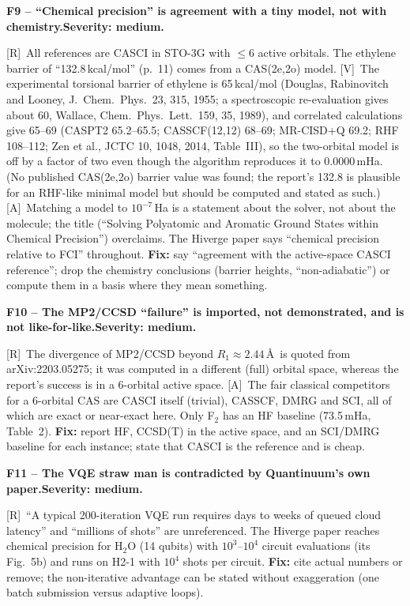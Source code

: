 \documentclass[11pt,a4paper]{article}
\newcommand{\lR}{\textcolor{keyblue}{[R]}}   %
\newcommand{\lV}{\textcolor{keyblue}{[V]}}   %
\newcommand{\lA}{\textcolor{notegray}{[A]}}  %
\newcommand{\sev}[1]{\textbf{Severity: #1.}}
\newcommand{\flaw}[4]{\par\medskip\noindent\textbf{#1 -- #2.}\quad{\small\textcolor{notegray}{Where: #3.}}\quad\sev{#4}\par\nobreak}
\begin{document}
\flaw{F9}{``Chemical precision'' is agreement with a tiny model, not with chemistry}{title; abstract; p.~10, Table~2; p.~11}{medium}
\lR\ All references are CASCI in STO-3G with $\le6$ active orbitals. The ethylene barrier of ``132.8\,kcal/mol'' (p.~11) comes from a CAS(2e,2o) model. \lV\ The experimental torsional barrier of ethylene is 65\,kcal/mol (Douglas, Rabinovitch and Looney, J.\ Chem.\ Phys.\ 23, 315, 1955; a spectroscopic re-evaluation gives about 60, Wallace, Chem.\ Phys.\ Lett.\ 159, 35, 1989), and correlated calculations give 65--69 (CASPT2 65.2--65.5; CASSCF(12,12) 68--69; MR-CISD+Q 69.2; RHF 108--112; Zen et al., JCTC 10, 1048, 2014, Table~III), so the two-orbital model is off by a factor of two even though the algorithm reproduces it to 0.0000\,mHa. (No published CAS(2e,2o) barrier value was found; the report's 132.8 is plausible for an RHF-like minimal model but should be computed and stated as such.) \lA\ Matching a model to $10^{-7}$\,Ha is a statement about the solver, not about the molecule; the title (``Solving Polyatomic and Aromatic Ground States within Chemical Precision'') overclaims. The Hiverge paper says ``chemical precision relative to FCI'' throughout. \textbf{Fix:} say ``agreement with the active-space CASCI reference''; drop the chemistry conclusions (barrier heights, ``non-adiabatic'') or compute them in a basis where they mean something.

\flaw{F10}{The MP2/CCSD ``failure'' is imported, not demonstrated, and is not like-for-like}{abstract; p.~11, Sec.~5.2}{medium}
\lR\ The divergence of MP2/CCSD beyond $R_1\approx2.44$\,\AA\ is quoted from arXiv:2203.05275; it was computed in a different (full) orbital space, whereas the report's success is in a 6-orbital active space. \lA\ The fair classical competitors for a 6-orbital CAS are CASCI itself (trivial), CASSCF, DMRG and SCI, all of which are exact or near-exact here. Only F$_2$ has an HF baseline (73.5\,mHa, Table~2). \textbf{Fix:} report HF, CCSD(T) in the active space, and an SCI/DMRG baseline for each instance; state that CASCI is the reference and is cheap.

\flaw{F11}{The VQE straw man is contradicted by Quantinuum's own paper}{p.~3, Sec.~1.2}{medium}
\lR\ ``A typical 200-iteration VQE run requires days to weeks of queued cloud latency'' and ``millions of shots'' are unreferenced. The Hiverge paper reaches chemical precision for H$_2$O (14 qubits) with $10^3$--$10^4$ circuit evaluations (its Fig.~5b) and runs on H2-1 with $10^4$ shots per circuit. \textbf{Fix:} cite actual numbers or remove; the non-iterative advantage can be stated without exaggeration (one batch submission versus adaptive loops).
\end{document}
